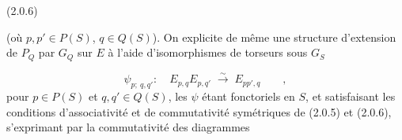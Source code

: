 (2.0.6) 
(où $p,p' \in P(S)$, $q \in Q(S)$). On explicite de même une structure d'extension de $P_Q$ par $G_Q$ sur $E$ à l'aide d'isomorphismes de torseurs sous $G_S$

\begin{equation}\tag{2.0.7}
\psi_{p;\ q,q'}: \quad E_{p,q}E_{p,q'} \;\overset{\sim}{\longrightarrow}\; E_{pp',q} \qquad ,
\end{equation}
pour $p \in P(S)$ et $q,q' \in Q(S)$, les $\psi$ étant fonctoriels en $S$, et satisfaisant les conditions d'associativité et de commutativité symétriques de (2.0.5) et (2.0.6), s'exprimant par la commutativité des diagrammes


